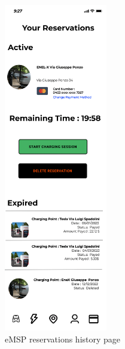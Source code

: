 \documentclass{Configuration_Files/PoliMi3i_thesis}
\begin{document}
\begin{figure}[H]
    \centering
    \includegraphics[width=0.4\textwidth]{Images/user-interface/emsp/eMSP (1)-12.png}
    \caption{eMSP reservations history page}
\end{figure}
\end{document}
